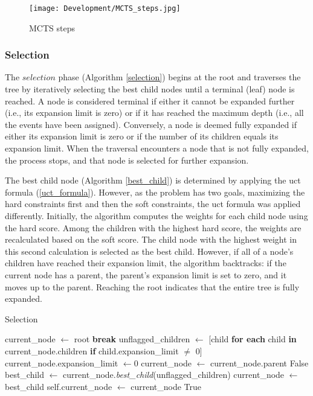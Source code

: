 \begin{figure}[H]
      \centering
      \texttt{[image: Development/MCTS\_steps.jpg]}
      \caption[MCTS steps]
      {MCTS steps}
      \label{fig:mcts_steps}
\end{figure}

\subsubsection{Selection}

The \(selection\) phase (Algorithm \ref{selection}) begins at the root and traverses the tree by iteratively selecting the best child nodes until a terminal (leaf) node is reached. A node is considered terminal if either it cannot be expanded further (i.e., its expansion limit is zero) or if it has reached the maximum depth (i.e., all the events have been assigned). Conversely, a node is deemed fully expanded if either its expansion limit is zero or if the number of its children equals its expansion limit. When the traversal encounters a node that is not fully expanded, the process stops, and that node is selected for further expansion.

The best child node (Algorithm \ref{best_child}) is determined by applying the \ac{uct} formula (\ref{uct_formula}). However, as the problem has two goals, maximizing the hard constraints first and then the soft constraints, the \ac{uct} formula was applied differently. Initially, the algorithm computes the weights for each child node using the hard score. Among the children with the highest hard score, the weights are recalculated based on the soft score. The child node with the highest weight in this second calculation is selected as the best child. However, if all of a node's children have reached their expansion limit, the algorithm backtracks: if the current node has a parent, the parent's expansion limit is set to zero, and it moves up to the parent. Reaching the root indicates that the entire tree is fully expanded.

\begin{algorithm}
\caption{Selection}\label{selection}
\begin{algorithmic}[1]
    \State current\_node $\gets$ root
            \State \textbf{break}
        \EndIf
        \State unflagged\_children $\gets$ [child \textbf{for each} child \textbf{in} current\_node.children \textbf{if} child.expansion\_limit $\neq$ 0]
                \State current\_node.expansion\_limit $\gets 0$
                \State current\_node $\gets$ current\_node.parent
            \Else
                \State \Return False
            \EndIf
        \Else
            \State best\_child $\gets$ current\_node.\textit{best\_child}(unflagged\_children)
            \State current\_node $\gets$ best\_child
        \EndIf
    \EndWhile
    \State self.current\_node $\gets$ current\_node
    \State \Return True
\EndProcedure
\end{algorithmic}
\end{algorithm}

